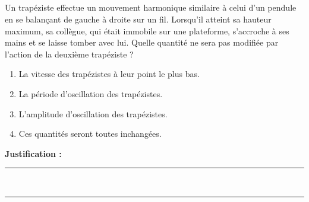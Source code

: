 \subsection{}
Un trapéziste effectue un mouvement harmonique similaire à celui d’un pendule en se balançant de gauche à droite sur un fil. Lorsqu’il atteint sa hauteur maximum, sa collègue, qui était immobile sur une plateforme, s’accroche à ses mains et se laisse tomber avec lui. Quelle quantité ne sera pas modifiée par l’action de la deuxième trapéziste ?

\begin{enumerate}[label=\Alph*)]
    \item La vitesse des trapézistes à leur point le plus bas.
    \item La période d’oscillation des trapézistes.
    \item L’amplitude d’oscillation des trapézistes.
    \item Ces quantités seront toutes inchangées.
\end{enumerate}

\noindent\textbf{Justification :} \hrulefill \\[2.5ex]
\rule{\linewidth}{0.4pt} \\[2.5ex]
\rule{\linewidth}{0.4pt}
\vfill